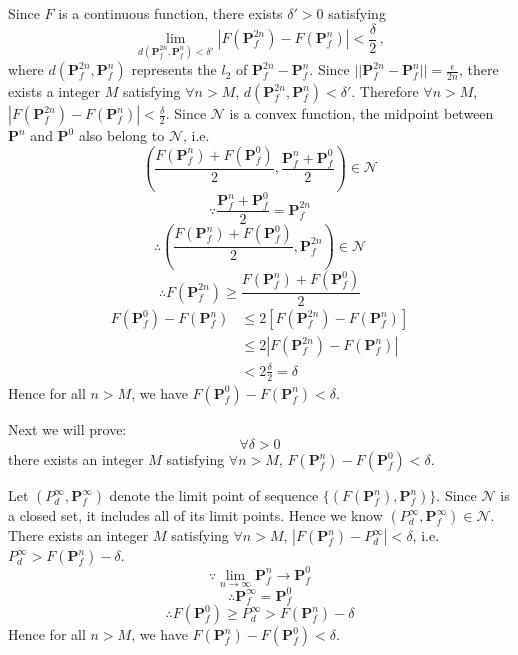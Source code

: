 \documentclass[12pt,journal,a4paper,twoside,onecolumn]{IEEEtran}
\begin{document}
\begin{spacing}{2.5}
Since $F$ is a continuous function, there exists $\delta' >0$ satisfying
\begin{equation}
\lim_{d(\mathbf{P}_f^{2n}, \mathbf{P}_f^n) < \delta' }|F(\mathbf{P}_f^{2n}) - F(\mathbf{P}_f^n)| < \frac{\delta}{2}\,,
\end{equation}
where $d(\mathbf{P}_f^{2n}, \mathbf{P}_f^n)$ represents the $l_2$ of $\mathbf{P}_f^{2n} -  \mathbf{P}_f^n$. Since $||\mathbf{P}_f^{2n} -  \mathbf{P}_f^n|| = \frac{\epsilon}{2n}$, there exists a integer $M$ satisfying $\forall n > M$, $d(\mathbf{P}_f^{2n}, \mathbf{P}_f^n) < \delta'$. Therefore $\forall n > M$, $|F(\mathbf{P}_f^{2n}) - F(\mathbf{P}_f^n)| < \frac{\delta}{2}$. 
Since $\mathcal{N}$ is a convex function, the midpoint between $\mathbf{P}^n$ and $\mathbf{P}^{0}$ also belong to $\mathcal{N}$, i.e.
\[
(\frac{F(\mathbf{P}_f^n) + F(\mathbf{P}_f^0)}{2}, \frac{\mathbf{P}_f^n + \mathbf{P}_f^0}{2}) \in \mathcal{N}
\]
\[
\because \frac{\mathbf{P}_f^n + \mathbf{P}_f^0}{2} = \mathbf{P}_f^{2n}
\]
\[
\therefore  (\frac{F(\mathbf{P}_f^n) + F(\mathbf{P}_f^0)}{2}, \mathbf{P}_f^{2n}) \in \mathcal{N}
\]
\[
\therefore F(\mathbf{P}_f^{2n}) \geq \frac{F(\mathbf{P}_f^n) + F(\mathbf{P}_f^0)}{2}
\]
\begin{equation}
\begin{split}
F(\mathbf{P}_f^0) - F(\mathbf{P}_f^n) &\leq 2[F(\mathbf{P}_f^{2n}) - F(\mathbf{P}_f^n)]\\
&\leq 2|F(\mathbf{P}_f^{2n}) - F(\mathbf{P}_f^n)|\\
&< 2 \frac{\delta}{2} = \delta
\end{split}
\end{equation}
Hence for all $n > M$, we have $F(\mathbf{P}_f^0) - F(\mathbf{P}_f^n) < \delta$. 

Next we will prove: 
\[
\forall \delta >0
\]
there exists an integer $M$ satisfying $\forall n > M$, $F(\mathbf{P}_f^n) - F(\mathbf{P}_f^0) < \delta$.

Let $(P_d^{\infty}, \mathbf{P}_f^{\infty})$ denote the limit point of sequence $\{(F(\mathbf{P}_f^n), \mathbf{P}_f^n)\}$. Since $\mathcal{N}$ is a closed set, it includes all of its limit points. Hence we know $(P_d^{\infty}, \mathbf{P}_f^{\infty}) \in \mathcal{N}$. There exists an integer $M$ satisfying $\forall n > M$, $|F(\mathbf{P}_f^n) - P_d^\infty| < \delta$, i.e. $P_d^\infty > F(\mathbf{P}_f^n) - \delta$. 
\[
\because \lim_{n \rightarrow \infty} \mathbf{P}_f^n \rightarrow \mathbf{P}_f^0
\]
\[
\therefore \mathbf{P}_f^{\infty} = \mathbf{P}_f^0
\]
\[
\therefore F(\mathbf{P}_f^0) \geq P_d^\infty > F(\mathbf{P}_f^n) - \delta
\]
Hence for all $n > M$, we have $F(\mathbf{P}_f^n) - F(\mathbf{P}_f^0) < \delta$.


\end{spacing}
\end{document}
